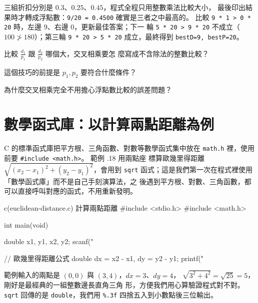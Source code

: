 三組折扣分別是 $0.3$、$0.25$、$0.45$，程式全程只用整數乘法比較大小，
最後印出結果時才轉成浮點數：\texttt{9/20 = 0.4500} 確實是三者之中最高的。
比較 \texttt{9 * 1 > 0 * 20} 時，左邊 $9$、右邊 $0$，更新最佳答案；下一
輪 \texttt{5 * 20 > 9 * 20} 不成立（$100 \not> 180$）；第三輪
\texttt{9 * 20 > 5 * 20} 成立，最終得到 \texttt{bestD=9, bestP=20}。


\begin{drills}[label=drills:float-cross-mult]
\item 比較 $\frac{d_1}{p_1}$ 跟 $\frac{d_2}{p_2}$ 哪個大，交叉相乘要怎
麼寫成不含除法的整數比較？
\item 這個技巧的前提是 $p_1, p_2$ 要符合什麼條件？
\item 為什麼交叉相乘完全不用擔心浮點數比較的誤差問題？
\end{drills}

\section{數學函式庫：以計算兩點距離為例}
\label{sec:float-math-lib}

C 的標準函式庫把平方根、三角函數、對數等數學函式集中放在 \texttt{math.h}
裡，使用前要 \texttt{\#include <math.h>}。 範例 \thechapter.18 用兩點座
標算歐幾里得距離 $\sqrt{(x_2-x_1)^2 + (y_2-y_1)^2}$，會用到 \texttt{sqrt}
函式；這是我們第一次在程式裡使用「數學函式庫」而不是自己手刻演算法，之
後遇到平方根、對數、三角函數，都可以直接呼叫對應的函式，不用重新發明。

\begin{example}{c}{(euclidean-distance.c) 計算兩點距離}
#include <stdio.h>
#include <math.h>

int main(void) {
    double x1, y1, x2, y2;
    scanf("%

    // 歐幾里得距離公式
    double dx = x2 - x1, dy = y2 - y1;
    printf("%
}
\end{example}


範例輸入的兩點是 $(0, 0)$ 與 $(3, 4)$，$dx = 3$、$dy = 4$，
$\sqrt{3^2 + 4^2} = \sqrt{25} = 5$，剛好是最經典的一組整數邊長直角三角
形，方便我們用心算驗證程式對不對。 \texttt{sqrt} 回傳的是
\texttt{double}，我們用 \texttt{\%.3f} 四捨五入到小數點後三位輸出。

